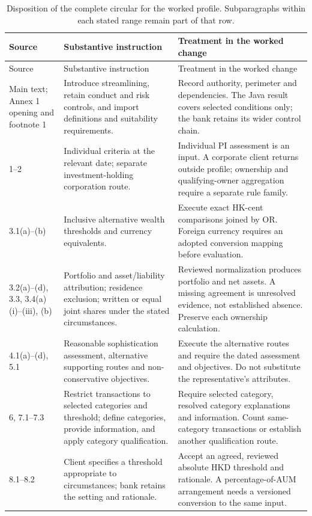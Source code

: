 \begingroup\small
\begin{longtable}{P{0.14\textwidth}P{0.37\textwidth}P{0.39\textwidth}}
\caption{Disposition of the complete circular for the worked profile. Subparagraphs
within each stated range remain part of that row.}\label{tab:circular-inventory}\\
\toprule Source & Substantive instruction & Treatment in the worked change \\\midrule
\endfirsthead
\toprule Source & Substantive instruction & Treatment in the worked change \\\midrule
\endhead
Main text; Annex 1 opening and footnote 1 & Introduce streamlining, retain conduct and risk controls, and import definitions and suitability requirements. & Record authority, perimeter and dependencies. The Java result covers selected conditions only; the bank retains its wider control chain.\\
1--2 & Individual criteria at the relevant date; separate investment-holding corporation route. & Individual PI assessment is an input. A corporate client returns outside profile; ownership and qualifying-owner aggregation require a separate rule family.\\
3.1(a)--(b) & Inclusive alternative wealth thresholds and currency equivalents. & Execute exact HK-cent comparisons joined by OR. Foreign currency requires an adopted conversion mapping before evaluation.\\
3.2(a)--(d), 3.3, 3.4(a)(i)--(iii), (b) & Portfolio and asset/liability attribution; residence exclusion; written or equal joint shares under the stated circumstances. & Reviewed normalization produces portfolio and net assets. A missing agreement is unresolved evidence, not established absence. Preserve each ownership calculation.\\
4.1(a)--(d), 5.1 & Reasonable sophistication assessment, alternative supporting routes and non-conservative objectives. & Execute the alternative routes and require the dated assessment and objectives. Do not substitute the representative's attributes.\\
6, 7.1--7.3 & Restrict transactions to selected categories and threshold; define categories, provide information, and apply category qualification. & Require selected category, resolved category explanations and information. Count same-category transactions or establish another qualification route.\\
8.1--8.2 & Client specifies a threshold appropriate to circumstances; bank retains the setting and rationale. & Accept an agreed, reviewed absolute HKD threshold and rationale. A percentage-of-AUM arrangement needs a versioned conversion to the same input.\\

\end{longtable}
